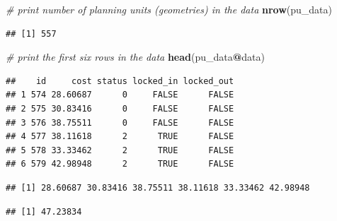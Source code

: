 \documentclass[12pt,]{book}
\newenvironment{Shaded}{\begin{snugshade}}{\end{snugshade}}
\newcommand{\KeywordTok}[1]{\textcolor[rgb]{0.13,0.29,0.53}{\textbf{#1}}}
\newcommand{\CommentTok}[1]{\textcolor[rgb]{0.56,0.35,0.01}{\textit{#1}}}
\newcommand{\OperatorTok}[1]{\textcolor[rgb]{0.81,0.36,0.00}{\textbf{#1}}}
\newcommand{\NormalTok}[1]{#1}
\begin{document}
\begin{Shaded}
\begin{Highlighting}[]
\CommentTok{# print number of planning units (geometries) in the data}
\KeywordTok{nrow}\NormalTok{(pu_data)}
\end{Highlighting}
\end{Shaded}

\begin{verbatim}
## [1] 557
\end{verbatim}

\begin{Shaded}
\begin{Highlighting}[]
\CommentTok{# print the first six rows in the data}
\KeywordTok{head}\NormalTok{(pu_data}\OperatorTok{@}\NormalTok{data)}
\end{Highlighting}
\end{Shaded}

\begin{verbatim}
##    id     cost status locked_in locked_out
## 1 574 28.60687      0     FALSE      FALSE
## 2 575 30.83416      0     FALSE      FALSE
## 3 576 38.75511      0     FALSE      FALSE
## 4 577 38.11618      2      TRUE      FALSE
## 5 578 33.33462      2      TRUE      FALSE
## 6 579 42.98948      2      TRUE      FALSE
\end{verbatim}

\begin{Shaded}
\end{Shaded}

\begin{verbatim}
## [1] 28.60687 30.83416 38.75511 38.11618 33.33462 42.98948
\end{verbatim}

\begin{Shaded}
\end{Shaded}

\begin{verbatim}
## [1] 47.23834
\end{verbatim}
\end{document}
